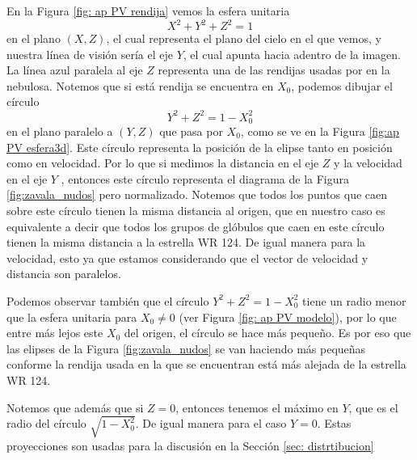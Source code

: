 \documentclass{book}
\begin{document}
En la Figura \ref{fig: ap PV rendija} vemos la esfera unitaria
\begin{equation}
X^2+Y^2+Z^2=1
\end{equation}
 en el plano $(X,Z)$, el cual representa el plano del cielo en el que vemos, y nuestra línea de visión sería el eje $Y$, el cual apunta hacia adentro de la imagen. La línea azul paralela al eje $Z$ representa una de las rendijas usadas por \cite{Zavala:2022} en  la nebulosa. Notemos que si está rendija se encuentra en $X_0$, podemos dibujar el círculo 
 \begin{equation}
 Y^2+Z^2=1-X_0^2
 \end{equation}
en el plano paralelo a $(Y,Z)$ que pasa por $X_0$, como se ve en la Figura \ref{fig:ap PV esfera3d}. Este círculo representa la posición de la elipse tanto en posición como en velocidad. Por lo que si medimos la distancia en el eje $Z$ y la velocidad en el eje $Y$ , entonces este círculo representa el diagrama de la Figura \ref{fig:zavala_nudos} pero normalizado. Notemos que todos los puntos que caen sobre este círculo tienen la misma distancia al origen, que en nuestro caso es equivalente a decir que todos los grupos de glóbulos que caen en este círculo tienen la misma distancia a la estrella WR 124. De igual manera
para la velocidad, esto ya que estamos considerando que el vector de velocidad y distancia son paralelos.

Podemos observar también que el círculo $Y^2+Z^2=1-X_0^2$ tiene un radio menor que la esfera unitaria  para $X_0\neq0$ (ver Figura \ref{fig: ap PV modelo}), por lo que entre más lejos este $X_0$ del origen, el círculo se hace más pequeño. Es por eso que las elipses de la Figura \ref{fig:zavala_nudos} se van haciendo más pequeñas conforme la rendija usada en la que se encuentran está más alejada de la estrella WR 124. 

Notemos que además que si $Z=0$, entonces tenemos el máximo en $Y$, que es el radio del círculo $\sqrt{1-X_0^2}$. De igual manera para el caso $Y=0$. Estas proyecciones son usadas para la discusión en la Sección \ref{sec: distrtibucion}
\end{document}
